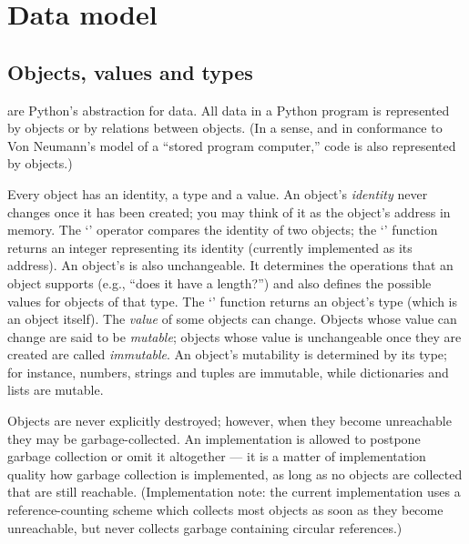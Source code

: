 \chapter{Data model}

\section{Objects, values and types}

 are Python's abstraction for data.  All data in a Python
program is represented by objects or by relations between objects.
(In a sense, and in conformance to Von Neumann's model of a
``stored program computer,'' code is also represented by objects.)

Every object has an identity, a type and a value.  An object's
\emph{identity} never changes once it has been created; you may think
of it as the object's address in memory.  The `' operator
compares the identity of two objects; the `' function
returns an integer representing its identity (currently implemented as
its address).
An object's  is
also unchangeable.  It determines the operations that an object
supports (e.g., ``does it have a length?'') and also defines the
possible values for objects of that type.  The `'
function returns an object's type (which is an object itself).
The \emph{value} of some
objects can change.  Objects whose value can change are said to be
\emph{mutable}; objects whose value is unchangeable once they are
created are called \emph{immutable}.
An object's mutability is determined by its type; for instance,
numbers, strings and tuples are immutable, while dictionaries and
lists are mutable.

Objects are never explicitly destroyed; however, when they become
unreachable they may be garbage-collected.  An implementation is
allowed to postpone garbage collection or omit it altogether --- it is a
matter of implementation quality how garbage collection is
implemented, as long as no objects are collected that are still
reachable.  (Implementation note: the current implementation uses a
reference-counting scheme which collects most objects as soon as they
become unreachable, but never collects garbage containing circular
references.)

